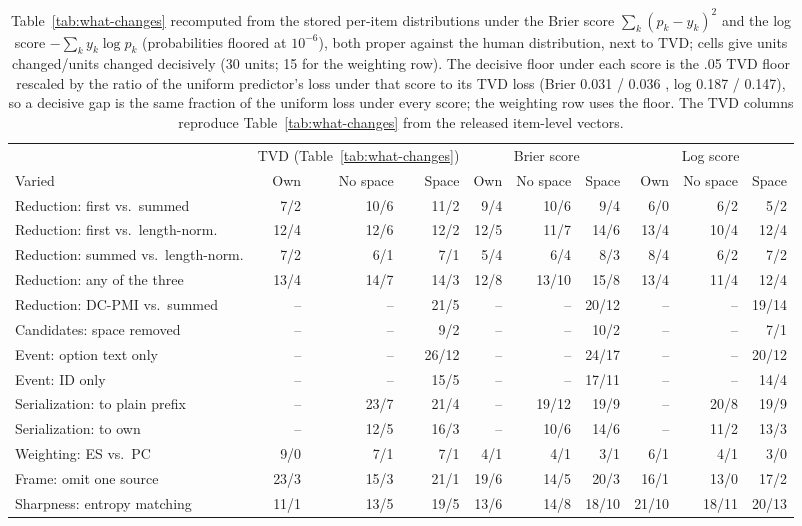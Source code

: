 \begin{table}[t]
\centering\scriptsize
\setlength{\tabcolsep}{3pt}
\begin{tabular}{@{}lrrrrrrrrr@{}}
\toprule
& \multicolumn{3}{c}{TVD (Table~\ref{tab:what-changes})} & \multicolumn{3}{c}{Brier score} & \multicolumn{3}{c}{Log score} \\
\cmidrule(lr){2-4}\cmidrule(lr){5-7}\cmidrule(l){8-10}
Varied & Own & No space & Space & Own & No space & Space & Own & No space & Space \\
\midrule
Reduction: first vs.\ summed & 7/2 & 10/6 & 11/2 & 9/4 & 10/6 & 9/4 & 6/0 & 6/2 & 5/2 \\
Reduction: first vs.\ length-norm. & 12/4 & 12/6 & 12/2 & 12/5 & 11/7 & 14/6 & 13/4 & 10/4 & 12/4 \\
Reduction: summed vs.\ length-norm. & 7/2 & 6/1 & 7/1 & 5/4 & 6/4 & 8/3 & 8/4 & 6/2 & 7/2 \\
Reduction: any of the three & 13/4 & 14/7 & 14/3 & 12/8 & 13/10 & 15/8 & 13/4 & 11/4 & 12/4 \\
Reduction: DC-PMI vs.\ summed & -- & -- & 21/5 & -- & -- & 20/12 & -- & -- & 19/14 \\
Candidates: space removed & -- & -- & 9/2 & -- & -- & 10/2 & -- & -- & 7/1 \\
Event: option text only & -- & -- & 26/12 & -- & -- & 24/17 & -- & -- & 20/12 \\
Event: ID only & -- & -- & 15/5 & -- & -- & 17/11 & -- & -- & 14/4 \\
Serialization: to plain prefix & -- & 23/7 & 21/4 & -- & 19/12 & 19/9 & -- & 20/8 & 19/9 \\
Serialization: to own & -- & 12/5 & 16/3 & -- & 10/6 & 14/6 & -- & 11/2 & 13/3 \\
Weighting: ES vs.\ PC & 9/0 & 7/1 & 7/1 & 4/1 & 4/1 & 3/1 & 6/1 & 4/1 & 3/0 \\
Frame: omit one source & 23/3 & 15/3 & 21/1 & 19/6 & 14/5 & 20/3 & 16/1 & 13/0 & 17/2 \\
Sharpness: entropy matching & 11/1 & 13/5 & 19/5 & 13/6 & 14/8 & 18/10 & 21/10 & 18/11 & 20/13 \\
\bottomrule
\end{tabular}
\caption{Table~\ref{tab:what-changes} recomputed from the stored per-item distributions under the Brier score $\sum_k (p_k-y_k)^2$ and the log score $-\sum_k y_k\log p_k$ (probabilities floored at $10^{-6}$), both proper against the human distribution, next to TVD; cells give units changed/units changed decisively (30 units; 15 for the weighting row). The decisive floor under each score is the .05 TVD floor rescaled by the ratio of the uniform predictor's loss under that score to its TVD loss (Brier 0.031 \ES{} / 0.036 \PC{}, log 0.187 / 0.147), so a decisive gap is the same fraction of the uniform loss under every score; the weighting row uses the \PC{} floor. The TVD columns reproduce Table~\ref{tab:what-changes} from the released item-level vectors.}
\label{tab:proper-scores}
\end{table}
